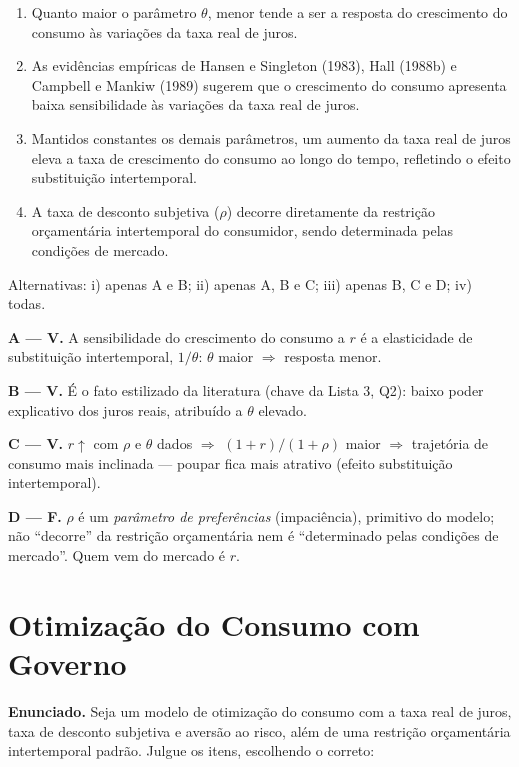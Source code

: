 \documentclass[12pt, a4paper]{article}
\begin{document}
\begin{enumerate}[label=\Alph*.]
\item Quanto maior o parâmetro $\theta$, menor tende a ser a resposta do
crescimento do consumo às variações da taxa real de juros.
\item As evidências empíricas de Hansen e Singleton (1983), Hall (1988b) e
Campbell e Mankiw (1989) sugerem que o crescimento do consumo apresenta baixa
sensibilidade às variações da taxa real de juros.
\item Mantidos constantes os demais parâmetros, um aumento da taxa real de
juros eleva a taxa de crescimento do consumo ao longo do tempo, refletindo o
efeito substituição intertemporal.
\item A taxa de desconto subjetiva ($\rho$) decorre diretamente da restrição
orçamentária intertemporal do consumidor, sendo determinada pelas condições de
mercado.
\end{enumerate}
Alternativas: i) apenas A e B; ii) apenas A, B e C; iii) apenas B, C e D;
iv) todas.

\begin{correctbox}[title={Resposta: ii) Apenas A, B e C estão corretas}]
\textbf{A --- V.} A sensibilidade do crescimento do consumo a $r$ é a
elasticidade de substituição intertemporal, $1/\theta$: $\theta$ maior
$\Rightarrow$ resposta menor.

\textbf{B --- V.} É o fato estilizado da literatura (chave da Lista 3, Q2):
baixo poder explicativo dos juros reais, atribuído a $\theta$ elevado.

\textbf{C --- V.} $r\uparrow$ com $\rho$ e $\theta$ dados $\Rightarrow$
$(1+r)/(1+\rho)$ maior $\Rightarrow$ trajetória de consumo mais inclinada ---
poupar fica mais atrativo (efeito substituição intertemporal).

\textbf{D --- F.} $\rho$ é um \emph{parâmetro de preferências} (impaciência),
primitivo do modelo; não ``decorre'' da restrição orçamentária nem é
``determinado pelas condições de mercado''. Quem vem do mercado é $r$.
\end{correctbox}

\section{Otimização do Consumo com Governo}

\textbf{Enunciado.} Seja um modelo de otimização do consumo com a taxa real de
juros, taxa de desconto subjetiva e aversão ao risco, além de uma restrição
orçamentária intertemporal padrão. Julgue os itens, escolhendo o correto:
\end{document}
